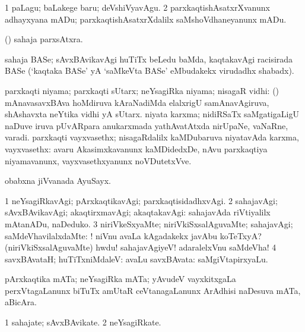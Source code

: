 \noindent
\gl{\akirx}
\bmng
\bnum
\num{1} paLagu; baLakege baru; deVshiVyavAgu. 
\num{2} parxkaqtishAsatxrXvanunx adhayxyana mADu; parxkaqtishAsatxrXdalilx saMshoVdhaneyanunx mADu. 
\enum
\emng
\eentry

\bentry
{}
\gl{\nA}
\bmng
(\saM) sahaja parxsAtxra. 
\emng
\eentry

\bentry
{}
\gl{\nA}
\bmng
sahaja BASe; sAvxBAvikavAgi huTiTx beLedu baMda, kaqtakavAgi racisirada BASe (`kaqtaka BASe' yA `saMkeVta BASe' eMbudakekx virudadhx shabadx). 
\emng
\eentry

\bentry
{}
\gl{\nA}
\bmng
parxkaqti niyama; parxkaqti sUtarx; neYsagiRka niyama; nisagaR vidhi: 
\banum
{} (\tashA) mAnavasavxBAva hoMdiruva kAraNadiMda elalxrigU samAnavAgiruva, shAshavxta neYtika vidhi yA sUtarx. 
 niyata karxma; nidiRSaTx saMgatigaLigU naDuve iruva pUvARpara anukarxmada yathAvatAtxda nirUpaNe, vaNaRne, varadi. 
 parxkaqti vayxvasethx; nisagaRdalilx kaMDubaruva niyatavAda karxma, vayxvasethx:  avaru Akasimxkavanunx kaMDidedxDe, nAvu parxkaqtiya niyamavanunx, vayxvasethxyanunx noVDutetxVve. 
\eanum
\emng
\eentry

\bentry
{}
\gl{\nA}
\bmng
obabxna jiVvanada AyuSayx. 
\emng
\eentry

\bentry
{}
\gl{\kirxvi}
\bmng
\bnum
\num{1} neYsagiRkavAgi; pArxkaqtikavAgi; parxkaqtisidadhxvAgi. 
\num{2} sahajavAgi; sAvxBAvikavAgi; akaqtirxmavAgi; akaqtakavAgi:  sahajavAda riVtiyalilx mAtanADu, naDeduko. 
\num{3} niriVkeSxyaMte; niriVkiSxsalAguvaMte; sahajavAgi; saMdeVhavilalxdaMte: ! niVnu avaLa kAgadakekx javAbu koTeTxyA? (niriVkiSxsalAguvaMte) hwdu! sahajavAgiyeV! adaralelxVnu saMdeVha! 
\num{4} savxBAvataH; huTiTxniMdaleV:  avaLu savxBAvata: saMgiVtapirxyaLu. 
\enum
\emng
\eentry

\bentry
{}
\gl{\nA}
\bmng
pArxkaqtika mATa; neYsagiRka mATa; yAvudeV vayxkitxgaLa perxVtagaLanunx biTuTx amUtaR ceVtanagaLanunx ArAdhisi naDesuva mATa, aBicAra. 
\emng
\eentry

\bentry
{}
\gl{\nA}
\bmng
\bnum
\num{1} sahajate; sAvxBAvikate. 
\num{2} neYsagiRkate. 
\enum
\emng
\eentry

